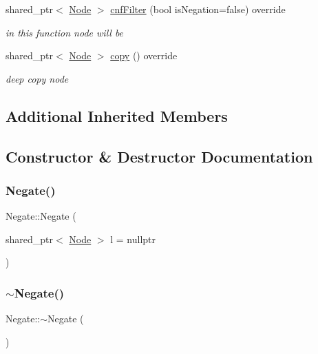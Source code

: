 \begin{DoxyCompactItemize}
shared\+\_\+ptr$<$ \hyperlink{class_node}{Node} $>$ \hyperlink{class_negate_a6aa803fea460f0a2a52399b778bfd268}{cnf\+Filter} (bool is\+Negation=false) override
\begin{DoxyCompactList}\small\item\em in this function node will be \end{DoxyCompactList}\item 
shared\+\_\+ptr$<$ \hyperlink{class_node}{Node} $>$ \hyperlink{class_negate_a7cdd545814e819ef6b6ec735dda357aa}{copy} () override
\begin{DoxyCompactList}\small\item\em deep copy node \end{DoxyCompactList}\end{DoxyCompactItemize}
\subsection*{Additional Inherited Members}


\subsection{Constructor \& Destructor Documentation}
\mbox{\label{class_negate_adb1a956d1f152e24fada7b1a33b0331e}} 
\subsubsection{\texorpdfstring{Negate()}{Negate()}}
{\footnotesize\ttfamily Negate\+::\+Negate (\begin{DoxyParamCaption}\item[{shared\+\_\+ptr$<$ \hyperlink{class_node}{Node} $>$}]{l = {\ttfamily nullptr} }\end{DoxyParamCaption})\hspace{0.3cm}{\ttfamily [explicit]}}

\mbox{\label{class_negate_a04d4e89273d5fcbfaad144df52e40041}} 
\subsubsection{\texorpdfstring{$\sim$\+Negate()}{~Negate()}}
{\footnotesize\ttfamily Negate\+::$\sim$\+Negate (\begin{DoxyParamCaption}{ }\end{DoxyParamCaption})\hspace{0.3cm}{\ttfamily [override]}}



